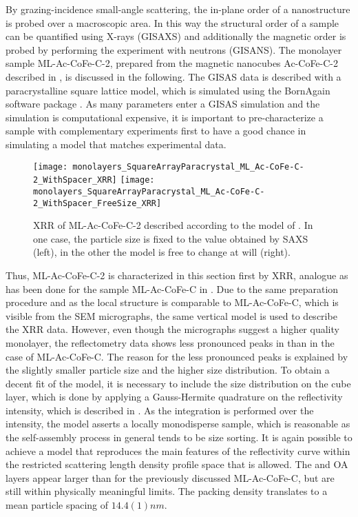 \documentclass[\main/dresen_thesis.tex]{subfiles}
\begin{document}
  By grazing-incidence small-angle scattering, the in-plane order of a nanostructure is probed over a macroscopic area.
  In this way the structural order of a sample can be quantified using X-rays (GISAXS) and additionally the magnetic order is probed by performing the experiment with neutrons (GISANS).
  The monolayer sample ML-Ac-CoFe-C-2, prepared from the magnetic nanocubes Ac-CoFe-C-2 described in , is discussed in the following.
  The GISAS data is described with a paracrystalline square lattice model, which is simulated using the BornAgain software package \cite{Burle_2018_borna}.
  As many parameters enter a GISAS simulation and the simulation is computational expensive, it is important to pre-characterize a sample with complementary experiments first to have a good chance in simulating a model that matches experimental data.

  \begin{figure}[tb]
    \centering
    \texttt{[image: monolayers\_SquareArrayParacrystal\_ML\_Ac-CoFe-C-2\_WithSpacer\_XRR]}
    \texttt{[image: monolayers\_SquareArrayParacrystal\_ML\_Ac-CoFe-C-2\_WithSpacer\_FreeSize\_XRR]}
    \caption{\label{fig:monolayers:structure:squareArrayParacrystal:XRR}XRR of ML-Ac-CoFe-C-2 described according to the model of . In one case, the particle size is fixed to the value obtained by SAXS (left), in the other the model is free to change at will (right).}
  \end{figure}

  Thus, ML-Ac-CoFe-C-2 is characterized in this section first by XRR, analogue as has been done for the sample ML-Ac-CoFe-C in .
  Due to the same preparation procedure and as the local structure is comparable to ML-Ac-CoFe-C, which is visible from the SEM micrographs, the same vertical model is used to describe the XRR data.
  However, even though the micrographs suggest a higher quality monolayer, the reflectometry data shows less pronounced peaks in  than in the case of ML-Ac-CoFe-C.
  The reason for the less pronounced peaks is explained by the slightly smaller particle size and the higher size distribution.
  To obtain a decent fit of the model, it is necessary to include the size distribution on the cube layer, which is done by applying a Gauss-Hermite quadrature on the reflectivity intensity, which is described in .
  As the integration is performed over the intensity, the model asserts a locally monodisperse sample, which is reasonable as the self-assembly process in general tends to be size sorting.
  It is again possible to achieve a model that reproduces the main features of the reflectivity curve within the restricted scattering length density profile space that is allowed.
  The  and OA layers appear larger than for the previously discussed ML-Ac-CoFe-C, but are still within physically meaningful limits.
  The packing density translates to a mean particle spacing of $14.4(1) \unit{nm}$.
\end{document}
